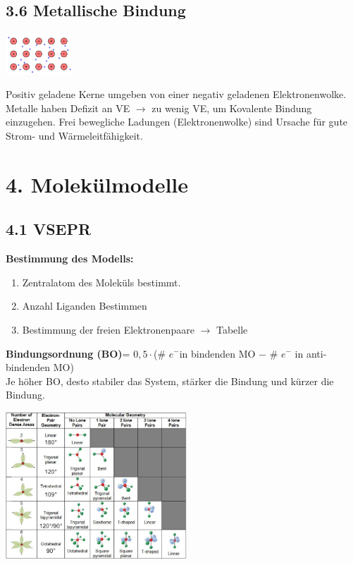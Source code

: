 \begin{multicols*}{4}
\subsection{3.6 Metallische Bindung}{    

        \begin{minipage}{25mm}
            \includegraphics[width=2.5cm]{Bilder/Metallische Bindung.png}
        \end{minipage}
        \begin{minipage}{42mm}
            Positiv geladene Kerne umgeben von einer negativ geladenen Elektronenwolke. Metalle haben
            Defizit an VE $\rightarrow$ zu wenig VE, um Kovalente Bindung einzugehen. Frei bewegliche Ladungen 
            (Elektronenwolke) sind Ursache für gute Strom- und Wärmeleitfähigkeit.
        \end{minipage}
}


\section{4. Molekülmodelle}
\subsection{4.1 VSEPR}{

\textbf{Bestimmung des Modells:}
\begin{enumerate}[noitemsep,leftmargin=*]
    \item Zentralatom des Moleküls bestimmt.
    \item Anzahl Liganden Bestimmen
    \item Bestimmung der freien Elektronenpaare $\rightarrow$ Tabelle
\end{enumerate}

\textbf{Bindungsordnung (BO)}=  $0,5\cdot$(\# $e^-$in bindenden MO $-$ \# $e^-$ in anti-bindenden MO)\\
Je höher BO, desto stabiler das System, stärker die Bindung und kürzer die Bindung. 

\begin{minipage}{68mm} %
	\includegraphics[width=68mm]{Bilder/VSEPER.PNG}
\end{minipage}

}
\end{multicols*}
